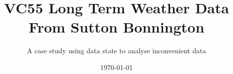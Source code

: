 \title[ VC55 Weather Case Study]{VC55 Long Term Weather Data From Sutton Bonnington} %
\subtitle{A case study using data state to analyse inconvenient data}


\date{\today} %

